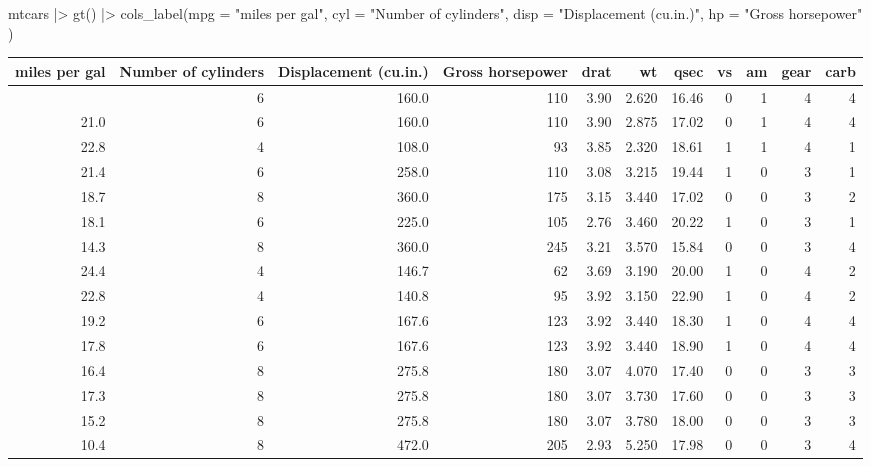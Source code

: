 \documentclass[
  letterpaper,
  DIV=11,
  numbers=noendperiod]{scrartcl}
\newenvironment{Shaded}{\begin{snugshade}}{\end{snugshade}}
\newcommand{\AttributeTok}[1]{\textcolor[rgb]{0.40,0.45,0.13}{#1}}
\newcommand{\FunctionTok}[1]{\textcolor[rgb]{0.28,0.35,0.67}{#1}}
\newcommand{\NormalTok}[1]{\textcolor[rgb]{0.00,0.23,0.31}{#1}}
\newcommand{\SpecialCharTok}[1]{\textcolor[rgb]{0.37,0.37,0.37}{#1}}
\newcommand{\StringTok}[1]{\textcolor[rgb]{0.13,0.47,0.30}{#1}}
\begin{document}
\begin{Shaded}
\begin{Highlighting}[]
\NormalTok{mtcars }\SpecialCharTok{|\textgreater{}} 
  \FunctionTok{gt}\NormalTok{() }\SpecialCharTok{|\textgreater{}}  
  \FunctionTok{cols\_label}\NormalTok{(}\AttributeTok{mpg =} \StringTok{"miles per gal"}\NormalTok{,}
             \AttributeTok{cyl =} \StringTok{"Number of cylinders"}\NormalTok{,}
             \AttributeTok{disp =} \StringTok{"Displacement (cu.in.)"}\NormalTok{,}
             \AttributeTok{hp =} \StringTok{"Gross horsepower"}
\NormalTok{             ) }
\end{Highlighting}
\end{Shaded}

\begin{longtable*}{rrrrrrrrrrr}
\toprule
miles per gal & Number of cylinders & Displacement (cu.in.) & Gross horsepower & drat & wt & qsec & vs & am & gear & carb \\ 
\midrule{} & 6 & 160.0 & 110 & 3.90 & 2.620 & 16.46 & 0 & 1 & 4 & 4 \\ 
21.0 & 6 & 160.0 & 110 & 3.90 & 2.875 & 17.02 & 0 & 1 & 4 & 4 \\ 
22.8 & 4 & 108.0 & 93 & 3.85 & 2.320 & 18.61 & 1 & 1 & 4 & 1 \\ 
21.4 & 6 & 258.0 & 110 & 3.08 & 3.215 & 19.44 & 1 & 0 & 3 & 1 \\ 
18.7 & 8 & 360.0 & 175 & 3.15 & 3.440 & 17.02 & 0 & 0 & 3 & 2 \\ 
18.1 & 6 & 225.0 & 105 & 2.76 & 3.460 & 20.22 & 1 & 0 & 3 & 1 \\ 
14.3 & 8 & 360.0 & 245 & 3.21 & 3.570 & 15.84 & 0 & 0 & 3 & 4 \\ 
24.4 & 4 & 146.7 & 62 & 3.69 & 3.190 & 20.00 & 1 & 0 & 4 & 2 \\ 
22.8 & 4 & 140.8 & 95 & 3.92 & 3.150 & 22.90 & 1 & 0 & 4 & 2 \\ 
19.2 & 6 & 167.6 & 123 & 3.92 & 3.440 & 18.30 & 1 & 0 & 4 & 4 \\ 
17.8 & 6 & 167.6 & 123 & 3.92 & 3.440 & 18.90 & 1 & 0 & 4 & 4 \\ 
16.4 & 8 & 275.8 & 180 & 3.07 & 4.070 & 17.40 & 0 & 0 & 3 & 3 \\ 
17.3 & 8 & 275.8 & 180 & 3.07 & 3.730 & 17.60 & 0 & 0 & 3 & 3 \\ 
15.2 & 8 & 275.8 & 180 & 3.07 & 3.780 & 18.00 & 0 & 0 & 3 & 3 \\ 
10.4 & 8 & 472.0 & 205 & 2.93 & 5.250 & 17.98 & 0 & 0 & 3 & 4 \\ 

\end{longtable*}
\end{document}
